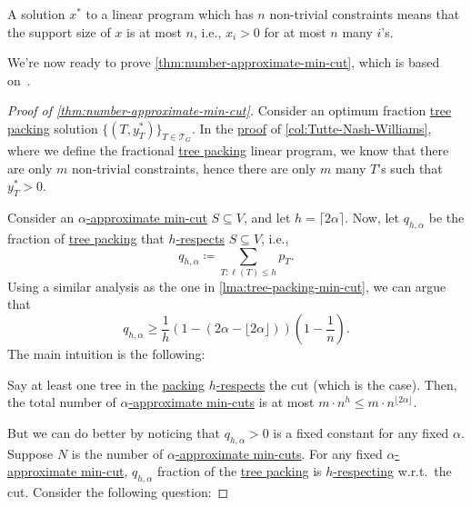 \begin{prev}
	A solution \(x^{\ast} \) to a linear program which has \(n\) non-trivial constraints means that the support size of \(x\) is at most \(n\), i.e., \(x_i > 0\) for at most \(n\) many \(i\)'s.
\end{prev}

We're now ready to prove \autoref{thm:number-approximate-min-cut}, which is based on~\cite{chekuri2020lp}.

\begin{proof}[Proof of \autoref{thm:number-approximate-min-cut}]
	Consider an optimum fraction \hyperref[prb:tree-packing]{tree packing} solution \(\{ (T, y_T^{\ast} ) \}_{T \in \mathcal{T} _G} \). In the \hyperref[pf:col:Tutte-Nash-Williams]{proof} of \autoref{col:Tutte-Nash-Williams}, where we define the fractional \hyperref[prb:tree-packing]{tree packing} linear program, we know that there are only \(m\) non-trivial constraints, hence there are only \(m\) many \(T\)'s such that \(y^{\ast} _T > 0\).

	Consider an \hyperref[def:approximate-min-cut]{\(\alpha \)-approximate min-cut} \(S \subseteq V\), and let \(h = \lceil 2 \alpha \rceil \). Now, let \(q_{h, \alpha }\) be the fraction of \hyperref[prb:tree-packing]{tree packing} that \hyperref[def:respect]{\(h\)-respects} \(S \subseteq V\), i.e.,
	\[
		q_{h, \alpha }
		\coloneqq \sum_{T \colon \ell (T) \leq h} p_T.
	\]
	Using a similar analysis as the one in \autoref{lma:tree-packing-min-cut}, we can argue that
	\[
		q_{h, \alpha }
		\geq \frac{1}{h} (1 - (2\alpha - \lfloor 2 \alpha \rfloor )) \left( 1 - \frac{1}{n} \right) .
	\]
	The main intuition is the following:

	\begin{intuition}
		Say at least one tree in the \hyperref[prb:tree-packing]{packing} \hyperref[def:respect]{\(h\)-respects} the cut (which is the case). Then, the total number of \hyperref[def:approximate-min-cut]{\(\alpha \)-approximate min-cuts} is at most \(m \cdot n^h \leq m \cdot n ^{\lfloor 2 \alpha \rfloor }\).
	\end{intuition}

	But we can do better by noticing that \(q_{h, \alpha } > 0\) is a fixed constant for any fixed \(\alpha \). Suppose \(N\) is the number of \hyperref[def:approximate-min-cut]{\(\alpha \)-approximate min-cuts}. For any fixed \hyperref[def:approximate-min-cut]{\(\alpha \)-approximate min-cut}, \(q_{h, \alpha }\) fraction of the \hyperref[prb:tree-packing]{tree packing} is \hyperref[def:respect]{\(h\)-respecting} w.r.t.\ the cut. Consider the following question:


\end{proof}

